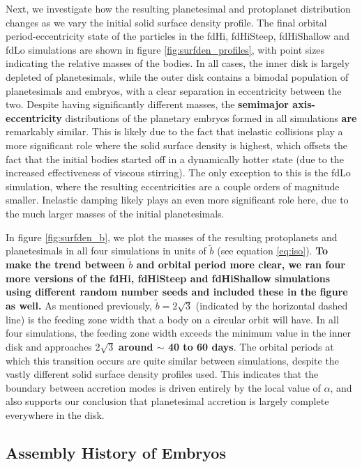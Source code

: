 \documentclass[twocolumn,linenumbers]{aastex63}
\begin{document}
Next, we investigate how the resulting planetesimal and protoplanet distribution
changes as we vary the initial solid surface density profile.
The final orbital period-eccentricity state of the
particles in the fdHi, fdHiSteep, fdHiShallow and fdLo simulations are shown in figure \ref{fig:surfden_profiles}, with point sizes 
indicating the relative masses of the bodies. In all cases, the inner disk is largely depleted of planetesimals, while the outer disk 
contains a bimodal population of planetesimals and embryos, with a clear separation in eccentricity between the two. Despite 
having significantly different masses, the \textbf{semimajor axis-eccentricity} distributions of the planetary embryos formed in all simulations \textbf{are} remarkably similar. This 
is likely due to the fact that inelastic collisions play a more significant role where the solid surface density is highest, which 
offsets the fact that the initial bodies started off in a dynamically hotter state (due to the increased effectiveness of viscous stirring). The only exception to this is the fdLo simulation, 
where the resulting eccentricities are a couple orders of magnitude smaller. Inelastic damping likely plays an even more 
significant role here, due to the much larger masses of the initial planetesimals.

In figure \ref{fig:surfden_b}, we plot the masses of the resulting protoplanets and planetesimals in all four simulations in units of $
\tilde{b}$ (see equation \ref{eq:iso}). \textbf{To make the trend between $\tilde{b}$ and orbital period more clear, we ran four more versions of the fdHi, fdHiSteep and fdHiShallow simulations using different random number seeds and included these in the figure as well.}
As mentioned previously, $\tilde{b} = 2 \sqrt{3}$ (indicated by the horizontal dashed line) is the  
feeding zone width that a body on a circular orbit will have. In all four simulations, the feeding zone width exceeds the 
minimum value in the inner disk and approaches $2 \sqrt{3}$ \textbf{around $\sim$ 40 to 60 days}. The orbital periods at which this transition 
occurs are quite similar between simulations, despite the vastly different solid surface density profiles used. This indicates that 
the boundary between accretion modes is driven entirely by the local value of $\alpha$, and also supports our 
conclusion that planetesimal accretion is largely complete everywhere in the disk.

\subsection{Assembly History of Embryos}\label{sec:assembly}
\end{document}
